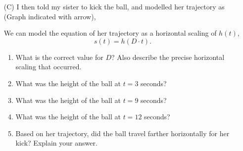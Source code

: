 \documentclass[12pt]{article} %
\begin{document}
\begin{qstn}
\begin{qstn}
\begin{enumerate}[label=(\alph*)]
  \item[(C)] I then told my sister to kick the ball, and modelled her trajectory as (Graph
    indicated with arrow),
      \begin{center}
      \end{center}
      We can model the equation of her trajectory as a horizontal scaling of $h(t)$, 
        \[
              s(t) = h(D\cdot t)
        .\]
      \begin{enumerate}[label=(\alph*)]
        \item What is the correct value for $D$? Also describe the precise horizontal scaling that occurred.
        \item What was the height of the ball at $t = 3$ seconds?
        \item What was the height of the ball at $t = 9$ seconds?
        \item What was the height of the ball at $t = 12$ seconds?
        \item Based on her trajectory, did the ball travel farther horizontally for her kick? Explain your
          answer.

      \end{enumerate}


\end{enumerate}



  
\end{qstn}














\end{qstn}
\end{document}
